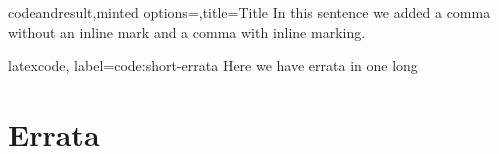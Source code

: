 \documentclass[a4paper,12pt]{report}
\begin{document}
\begin{examplecode}{codeandresult,minted options={},title=Title}
In this sentence\erratumAdd{,} we added a comma without an
inline mark\erratumAdd[inlinemark=true]{,} and a comma with
inline marking.
\end{examplecode}



\begin{examplecode}{latexcode, label={code:short-errata}}
Here we have  errata in one
 long 
\end{examplecode}

\chapter{Errata}\label{chap:errata}

\PrintErrata
\end{document}

